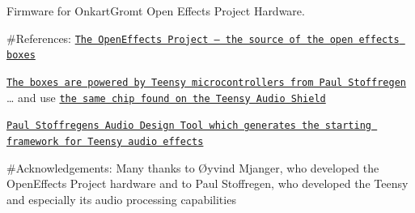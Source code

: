 Firmware for Onkart\+Gromt Open Effects Project Hardware. 

\#\+References\+: \href{http://openeffectsproject.com/}{\tt The Open\+Effects Project – the source of the open effects boxes}

\href{https://www.pjrc.com/}{\tt The boxes are powered by Teensy microcontrollers from Paul Stoffregen} … and use \href{https://www.pjrc.com/store/teensy3_audio.html}{\tt the same chip found on the Teensy Audio Shield}

\href{https://www.pjrc.com/teensy/gui/}{\tt Paul Stoffregen\textquotesingle{}s Audio Design Tool which generates the starting framework for Teensy audio effects}

\#\+Acknowledgements\+: Many thanks to Øyvind Mjanger, who developed the Open\+Effects Project hardware and to Paul Stoffregen, who developed the Teensy and especially its audio processing capabilities 